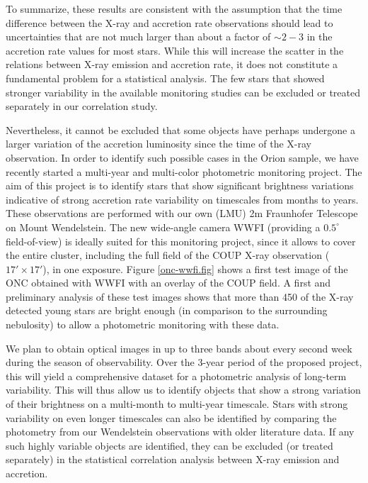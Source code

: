 \documentclass[10pt,fleqn,twoside,a4paper]{article}
\begin{document}
To summarize, these
results are consistent with the assumption that the 
time difference between the
X-ray and accretion rate observations should lead to uncertainties
that are not much larger than about
a factor of $\sim 2-3$ in the accretion rate values for most stars.
While this will increase the scatter in the relations between
X-ray emission and accretion rate, it does not constitute a fundamental problem for
a statistical analysis.
%
The few stars that showed stronger variability in the available
monitoring studies can be excluded or treated separately
in our correlation study.

\medskip


Nevertheless, it cannot be excluded that some objects have
perhaps undergone a larger variation of the accretion luminosity
since the time of the X-ray observation.
In order to identify such possible cases in the Orion sample,
we have recently started a multi-year and multi-color
photometric monitoring project.
%
The aim of this project is to identify stars
that show significant brightness variations indicative of strong accretion rate variability
on timescales from months to years.
%
These observations are performed with our own (LMU) 2m Fraunhofer Telescope 
on Mount Wendelstein. 
The new wide-angle camera WWFI (providing a $0.5^\circ$ field-of-view) 
is ideally suited for this monitoring project, since it allows to cover
the entire cluster, including the full field of the COUP X-ray observation ($17' \times 17'$), in
one exposure. 
Figure \ref{onc-wwfi.fig} shows a first test image of the 
ONC obtained with WWFI with an overlay of the COUP field.
%
A first and preliminary  analysis of these test images shows that more than
450 of the X-ray detected young stars are bright enough (in comparison
to the surrounding nebulosity) to allow a photometric monitoring 
with these data.

We plan to obtain optical images in up to three bands 
about every second week during the season of observability.
Over the 3-year period of the proposed project, this will yield
a comprehensive dataset for a photometric analysis of long-term
variability.
This will thus
allow us to identify objects that show a strong
variation of their brightness on a multi-month to multi-year timescale.
Stars with strong variability on even longer timescales can also be
identified by comparing the photometry from our Wendelstein observations
with older literature data.
%
If any such highly variable objects are identified, they can be excluded
(or treated separately) in the statistical correlation analysis
between X-ray emission and accretion.
\end{document}
